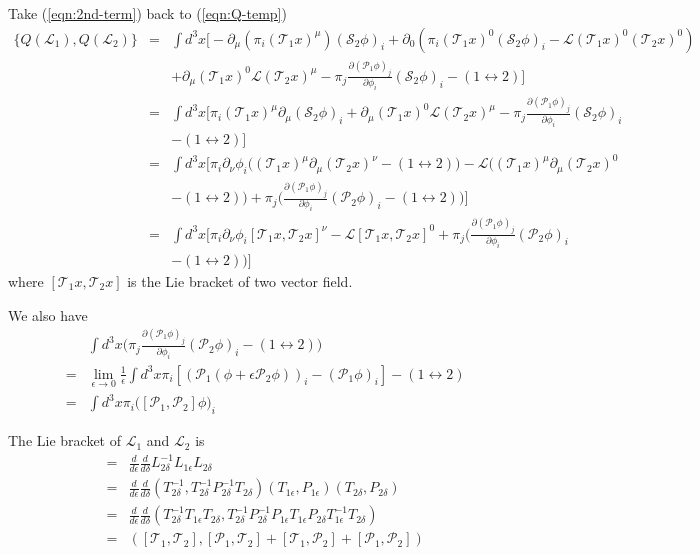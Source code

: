 \documentclass[12pt]{book}
\begin{document}
	Take (\ref{eqn:2nd-term}) back to (\ref{eqn:Q-temp})
	\begin{eqnarray}
		\{Q(\mathcal L_1),Q(\mathcal L_2)\}&=&\int d^3x\Big[-\partial_\mu(\pi_i(\mathcal T_1x)^\mu)(\mathcal S_2 \phi)_i+\partial_0(\pi_i(\mathcal T_1x)^0(\mathcal S_2 \phi)_i-\mathcal{L}(\mathcal T_1x)^0(\mathcal T_2x)^0) \nonumber\\
		&&+\partial_\mu(\mathcal T_1x)^0\mathcal L (\mathcal T_2x)^\mu-\pi_j\frac{\partial(\mathcal P_1\phi)_j}{\partial\phi_i}(\mathcal S_2 \phi)_i-(1\leftrightarrow 2)\Big]\\
		&=&\int d^3x\Big[\pi_i(\mathcal T_1x)^\mu\partial_\mu(\mathcal S_2 \phi)_i+\partial_\mu(\mathcal T_1x)^0\mathcal L (\mathcal T_2x)^\mu-\pi_j\frac{\partial(\mathcal P_1\phi)_j}{\partial\phi_i} (\mathcal S_2 \phi)_i\nonumber\\
		&&-(1\leftrightarrow 2)\Big]\\
		&=&\int d^3x\Big[\pi_i\partial_\nu\phi_i\Big((\mathcal T_1x)^\mu\partial_\mu(\mathcal T_2x)^\nu-(1\leftrightarrow 2)\Big)-\mathcal L\Big((\mathcal T_1x)^\mu\partial_\mu(\mathcal T_2x)^0 \nonumber\\
		&&-(1\leftrightarrow 2)\Big)+\pi_j\Big(\frac{\partial(\mathcal P_1\phi)_j}{\partial\phi_i}(\mathcal P_2\phi)_i-(1\leftrightarrow 2)\Big)\Big]\\
		&=&\int d^3x\Big[\pi_i\partial_\nu\phi_i[\mathcal T_1x,\mathcal T_2x]^\nu-\mathcal L[\mathcal T_1x,\mathcal T_2x]^0+\pi_j\Big(\frac{\partial(\mathcal P_1\phi)_j}{\partial\phi_i}(\mathcal P_2\phi)_i\nonumber\\
		&&-(1\leftrightarrow 2)\Big)\Big] \label{eqn:Q-poisson}
	\end{eqnarray}
	where $[\mathcal T_1x,\mathcal T_2x]$ is the Lie bracket of two vector field.
	
	We also have
	\begin{eqnarray}
	&&\int d^3x\Big(\pi_j\frac{\partial(\mathcal P_1\phi)_j}{\partial\phi_i}(\mathcal P_2\phi)_i-(1\leftrightarrow 2)\Big)\\
	&=&\lim_{\epsilon\rightarrow 0}\frac 1\epsilon\int d^3x\pi_i[(\mathcal P_1(\phi+\epsilon\mathcal P_2\phi))_i-(\mathcal P_1\phi)_i]-(1\leftrightarrow 2)\\
	&=&\int d^3x\pi_i\big([\mathcal P_1,\mathcal P_2]\phi\big)_i
	\end{eqnarray}
	
	The Lie bracket of $\mathcal L_1$ and $\mathcal L_2$ is
	\begin{eqnarray}
	[\mathcal L_1,\mathcal L_2]&=&\frac d {d\epsilon}\frac d {d\delta}L_{2\delta}^{-1}L_{1\epsilon}L_{2\delta}\\
	&=&\frac d {d\epsilon}\frac d {d\delta} (T_{2\delta}^{-1}, T_{2\delta}^{-1}P_{2\delta}^{-1}T_{2\delta})(T_{1\epsilon}, P_{1\epsilon})(T_{2\delta}, P_{2\delta})\\
	&=&\frac d {d\epsilon}\frac d {d\delta} (T_{2\delta}^{-1}T_{1\epsilon}T_{2\delta},T_{2\delta}^{-1}P_{2\delta}^{-1} P_{1\epsilon}T_{1\epsilon}P_{2\delta}T_{1\epsilon}^{-1}T_{2\delta})\\
	&=& ([\mathcal T_1,\mathcal T_2],[\mathcal P_1,\mathcal T_2]+[\mathcal T_1,\mathcal P_2]+[\mathcal P_1,\mathcal P_2])
	\end{eqnarray}
	
\end{document}
